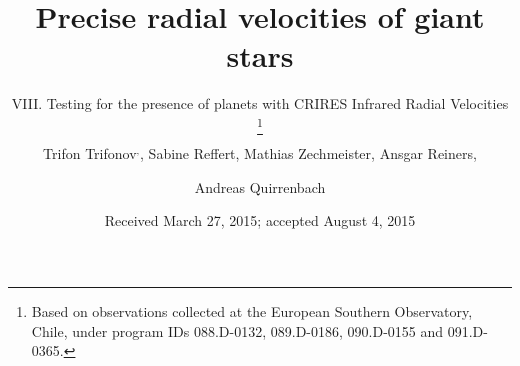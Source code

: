 \documentclass{aa}
\begin{document}
 

   \title{Precise radial velocities of giant stars \\
   }
   \subtitle{VIII. Testing for the presence of planets with CRIRES Infrared Radial Velocities
      \thanks{Based on observations collected at the European Southern Observatory, 
Chile, under program IDs 088.D-0132, 089.D-0186, 090.D-0155 and 
091.D-0365.}}

    \author{Trifon Trifonov$^{,}$, Sabine Reffert, Mathias Zechmeister, Ansgar Reiners, 
    \and Andreas Quirrenbach}
 
   
   \date{Received March 27, 2015; accepted August 4, 2015}



  
 
\end{document}
